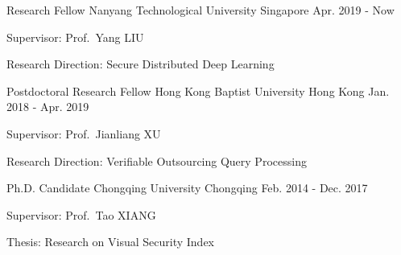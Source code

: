 \documentclass[11pt, a4paper]{awesome-cv}
\begin{document}
\vspace{-0.2cm}
\begin{cventries}
    \cventry%
    {Research Fellow}
    {Nanyang Technological University}
    {Singapore}
    {Apr. 2019 - Now} %
    {
        \begin{cvitems}
            \item{Supervisor: Prof.\ Yang LIU}
            \item{Research Direction: Secure Distributed Deep Learning}
        \end{cvitems}
    }
    \cventry%
    {Postdoctoral Research Fellow}
    {Hong Kong Baptist University}
    {Hong Kong}
    {Jan. 2018 - Apr. 2019} %
    {
        \begin{cvitems}
            \item{Supervisor: Prof.\ Jianliang XU}
            \item{Research Direction: Verifiable Outsourcing Query Processing}
        \end{cvitems}
    }
	\cventry%
	{Ph.D. Candidate}
	{Chongqing University}
	{Chongqing}
	{Feb. 2014 - Dec. 2017} %
	{
		\begin{cvitems}
			\item{Supervisor: Prof.\ Tao XIANG}
			\item{Thesis: Research on Visual Security Index}
		\end{cvitems}
	}
\end{cventries}

\begin{cvparagraph}
    \nocite{*}
    \printbibliography[heading=none]
\end{cvparagraph}

\newpage
{}
\begin{cvawards}
\end{cvawards}

\begin{description}
    \item[] 
    \item[] 
    \item[] 
\end{description}
\end{document}
